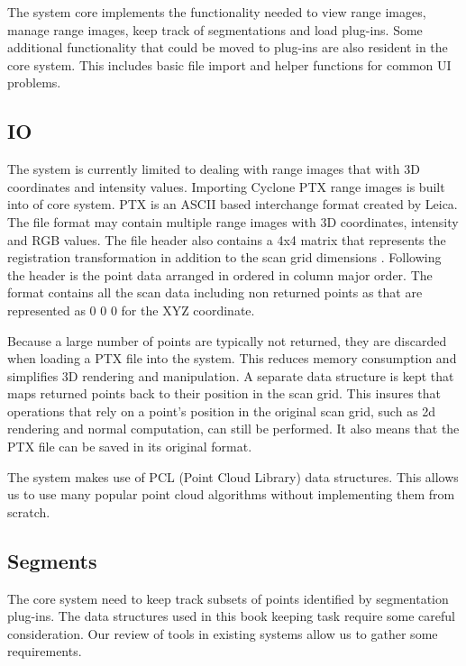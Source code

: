 The system core implements the functionality needed to view range images, manage range images, keep track of segmentations and load plug-ins. Some additional functionality that could be moved to plug-ins are also resident in the core system. This includes basic file import and helper functions for common UI problems.

\subsection{IO}

The system is currently limited to dealing with range images that with 3D coordinates and intensity values. Importing Cyclone PTX range images is built into of core system. PTX is an ASCII based interchange format created by Leica. The file format may contain multiple range images with 3D coordinates, intensity and RGB values. The file header also contains a 4x4 matrix that represents the registration transformation in addition to the scan grid dimensions \cite{Leica}. Following the header is the point data arranged in ordered in column major order. The format contains all the scan data including non returned points as that are represented as 0 0 0 for the XYZ coordinate.

Because a large number of points are typically not returned, they are discarded when loading a PTX file into the system. This reduces memory consumption and simplifies 3D rendering and manipulation. A separate data structure is kept that maps returned points back to their position in the scan grid. This insures that operations that rely on a point's position in the original scan grid, such as 2d rendering and normal computation, can still be performed. It also means that the PTX file can be saved in its original format.

The system makes use of PCL (Point Cloud Library) \cite{Rusu2011} data structures. This allows us to use many popular point cloud algorithms without implementing them from scratch.

\subsection{Segments} \label{sec:segments}

The core system need to keep track subsets of points identified by segmentation plug-ins. The data structures used in this book keeping task require some careful consideration. Our review of tools in existing systems allow us to gather some requirements.


